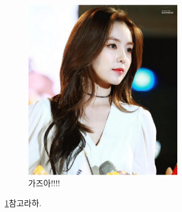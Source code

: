 \documentclass{oblivoir}
\begin{document}





\begin{figure}
\centering
\includegraphics[width=0.6\textwidth, page={4}]{RedVelvet}
\caption{가즈아!!!!} \label{fig:1}
\end{figure}

\ref{fig:1}\를 참고라하.
\end{document}
